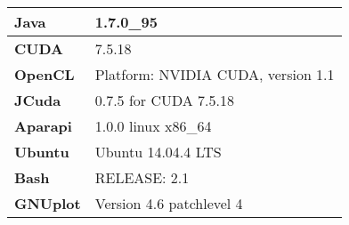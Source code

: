 \renewcommand{\arraystretch}{2}
\begin{tabular}{ l|l } 
 \hline
 \textbf{Java} & 1.7.0\_95 \\
 \hline
 \textbf{CUDA} & 7.5.18 \\ 
 \hline
 \textbf{OpenCL} & Platform: NVIDIA CUDA, version 1.1 \\ 
 \hline
 \textbf{JCuda} & 0.7.5 for CUDA 7.5.18 \\ 
 \hline
 \textbf{Aparapi} & 1.0.0 linux x86\_64 \\ 
 \hline
 \textbf{Ubuntu} & Ubuntu 14.04.4 LTS \\ 
 \hline
 \textbf{Bash} & RELEASE: 2.1 \\ 
 \hline
 \textbf{GNUplot} & Version 4.6 patchlevel 4 \\ 
 \hline
\end{tabular}
\renewcommand{\arraystretch}{1}